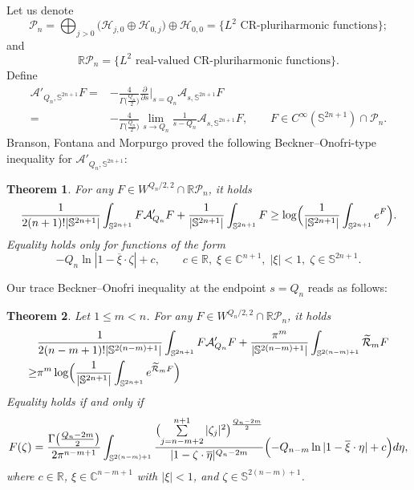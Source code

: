 \documentclass[12pt,reqno]{amsart}%
\newtheorem{theorem}{Theorem}[section]
\theoremstyle{plain}
\numberwithin{equation}{section}
\begin{document}
Let us denote
\[
\mathcal{P}_{n} = \bigoplus_{j>0} \bigl(\mathcal{H}_{j,0} \oplus \mathcal{H}_{0,j}\bigr) \oplus \mathcal{H}_{0,0}
= \bigl\{ L^2 \text{ CR-pluriharmonic functions} \bigr\};
\]
and
\[
\mathbb{R}\mathcal{P}_{n} = \bigl\{ L^2 \text{ real-valued CR-pluriharmonic functions} \bigr\}.
\]
Define
\begin{align}\nonumber
\mathcal{A}'_{Q_n,\mathbb{S}^{2n+1}} F
=& -\frac{4}{\Gamma\bigl(\frac{Q_n}{2}\bigr)}
\frac{\partial}{\partial s}\Big|_{s=Q_n} \mathcal{A}_{s,\mathbb{S}^{2n+1}} F \\
\label{1.7}
=& -\frac{4}{\Gamma\bigl(\frac{Q_n}{2}\bigr)}
\lim_{s\to Q_n} \frac{1}{s-Q_n}\mathcal{A}_{s,\mathbb{S}^{2n+1}} F,
\qquad F \in C^{\infty}(\mathbb{S}^{2n+1}) \cap \mathcal{P}_{n}.
\end{align}
Branson, Fontana and Morpurgo proved the following Beckner--Onofri-type inequality for \( \mathcal{A}'_{Q_n,\mathbb{S}^{2n+1}} \):
\begin{theorem}\label{th3.1} \cite{br1} \label{brl}
For any \( F \in W^{Q_n/2,2} \cap \mathbb{R}\mathcal{P}_{n} \), it holds
\begin{align}\label{1.8}
\frac{1}{2(n+1)!|\mathbb{S}^{2n+1}|}
\int_{\mathbb{S}^{2n+1}} F\mathcal{A}_{Q_n}'F
+\frac{1}{|\mathbb{S}^{2n+1}|}\int_{\mathbb{S}^{2n+1}} F \geq \log\Bigl(\frac{1}{|\mathbb{S}^{2n+1}|}\int_{\mathbb{S}^{2n+1}} e^{F}\Bigr).
\end{align}
Equality holds only for functions of the form
\[
- Q_n \ln|1 - \overline{\xi} \cdot \zeta| + c, \qquad
c \in \mathbb{R},\; \xi \in \mathbb{C}^{n+1},\; |\xi| < 1,\; \zeta \in \mathbb{S}^{2n+1}.
\]
\end{theorem}

Our trace  Beckner--Onofri inequality at the endpoint \( s = Q_n \) reads as follows:

\begin{theorem}\label{th1.7}
Let \( 1 \leq m < n \). For any \( F \in W^{Q_n/2,2} \cap \mathbb{R}\mathcal{P}_{n} \), it holds
\begin{align*}
&\frac{1}{2(n-m+1)!|\mathbb{S}^{2(n-m)+1}|}
\int_{\mathbb{S}^{2n+1}} F\mathcal{A}_{Q_n}'F+\frac{\pi^{m}}{|\mathbb{S}^{2(n-m)+1}|}\int_{\mathbb{S}^{2(n-m)+1}} \widetilde{\mathcal{R}}_mF  \\
\geq&
\pi^{m} \log\Bigl(\frac{1}{|\mathbb{S}^{2n+1}|}\int_{\mathbb{S}^{2n+1}} e^{\widetilde{\mathcal{R}}_mF}\Bigr)
\end{align*}
Equality holds if and only if
\begin{align*}
F(\zeta)
=
\frac{\Gamma\bigl(\frac{Q_n-2m}{2}\bigr)}
{2\pi^{n-m+1}}
\int_{\mathbb{S}^{2(n-m)+1}} \frac{\bigl(\sum\limits_{j=n-m+2}^{n+1}|\zeta_{j}|^{2}\bigr)^{\frac{Q_n-2m}{2}}}
{|1-\zeta\cdot\overline{\eta}|^{Q_n-2m}}\Bigl(-Q_{n-m}\ln|1 - \overline{\xi} \cdot \eta| + c\Bigr)  d\eta,
\end{align*}
where \( c \in \mathbb{R} \), \( \xi \in \mathbb{C}^{n-m+1} \) with \( |\xi| < 1 \), and \( \zeta \in \mathbb{S}^{2(n-m)+1} \).
\end{theorem}
\end{document}
